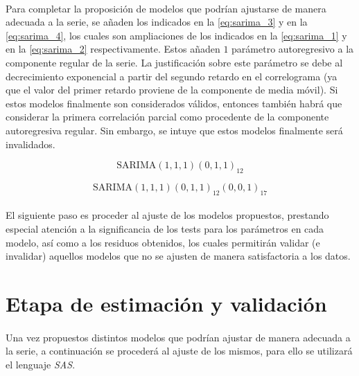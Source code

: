 \documentclass[a4paper, spanish]{article}
\begin{document}
      \paragraph{}
      Para completar la proposición de modelos que podrían ajustarse de manera adecuada a la serie, se añaden los indicados en la \autoref{eq:sarima_3} y en la \autoref{eq:sarima_4}, los cuales son ampliaciones de los indicados en la \autoref{eq:sarima_1} y en la \autoref{eq:sarima_2} respectivamente. Estos añaden $1$ parámetro autoregresivo a la componente regular de la serie. La justificación sobre este parámetro se debe al decrecimiento exponencial a partir del segundo retardo en el correlograma (ya que el valor del primer retardo proviene de la componente de media móvil). Si estos modelos finalmente son considerados válidos, entonces también habrá que considerar la primera correlación parcial como procedente de la componente autoregresiva regular. Sin embargo, se intuye que estos modelos finalmente será invalidados.

      \begin{equation}
        \label{eq:sarima_3}
        \text{SARIMA}(1, 1, 1)(0, 1, 1)_{12}
      \end{equation}

      \begin{equation}
        \label{eq:sarima_4}
        \text{SARIMA}(1, 1, 1)(0, 1, 1)_{12}(0, 0, 1)_{17}
      \end{equation}

      \paragraph{}
      El siguiente paso es proceder al ajuste de los modelos propuestos, prestando especial atención a la significancia de los tests para los parámetros en cada modelo, así como a los residuos obtenidos, los cuales permitirán validar (e invalidar) aquellos modelos que no se ajusten de manera satisfactoria a los datos.


  \section{Etapa de estimación y validación}
  \label{sec:fitting}

    \paragraph{}
    Una vez propuestos distintos modelos que podrían ajustar de manera adecuada a la serie, a continuación se procederá al ajuste de los mismos, para ello se utilizará el lenguaje \emph{SAS}.
\end{document}
